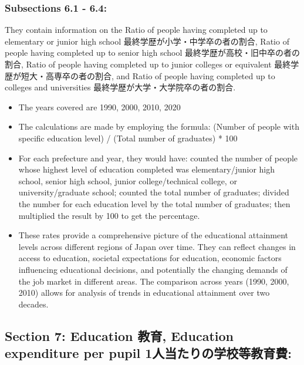 \documentclass[
]{ltjarticle}
\begin{document}
\hypertarget{subsections-6.1---6.4}{%
\subsubsection{Subsections 6.1 - 6.4:}\label{subsections-6.1---6.4}}

They contain information on the Ratio of people having completed up to
elementary or junior high school 最終学歴が小学・中学卒の者の割合, Ratio
of people having completed up to senior high school
最終学歴が高校・旧中卒の者の割合, Ratio of people having completed up to
junior colleges or equivalent 最終学歴が短大・高専卒の者の割合, and
Ratio of people having completed up to colleges and universities
最終学歴が大学・大学院卒の者の割合.

\begin{itemize}
\item
  The years covered are 1990, 2000, 2010, 2020
\item
  The calculations are made by employing the formula: (Number of people
  with specific education level) / (Total number of graduates) * 100
\item
  For each prefecture and year, they would have: counted the number of
  people whose highest level of education completed was
  elementary/junior high school, senior high school, junior
  college/technical college, or university/graduate school; counted the
  total number of graduates; divided the number for each education level
  by the total number of graduates; then multiplied the result by 100 to
  get the percentage.
\item
  These rates provide a comprehensive picture of the educational
  attainment levels across different regions of Japan over time. They
  can reflect changes in access to education, societal expectations for
  education, economic factors influencing educational decisions, and
  potentially the changing demands of the job market in different areas.
  The comparison across years (1990, 2000, 2010) allows for analysis of
  trends in educational attainment over two decades.
\end{itemize}

\hypertarget{section-7-education-ux6559ux80b2-education-expenditure-per-pupil-1ux4ebaux5f53ux305fux308aux306eux5b66ux6821ux7b49ux6559ux80b2ux8cbb}{%
\subsection{Section 7: Education 教育, Education expenditure per pupil
1人当たりの学校等教育費:}\label{section-7-education-ux6559ux80b2-education-expenditure-per-pupil-1ux4ebaux5f53ux305fux308aux306eux5b66ux6821ux7b49ux6559ux80b2ux8cbb}}
\end{document}
